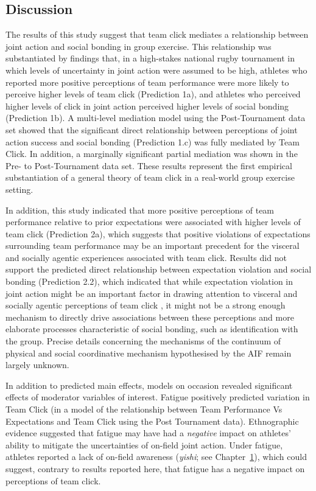 \begin{CJK}{UTF8}{gbsn}
\section{Discussion}
The results of this study suggest that team click mediates a relationship between joint action and social bonding in group exercise.  This relationship was substantiated by findings that, in a high-stakes national rugby tournament in which levels of uncertainty in joint action were assumed to be high, athletes who reported more positive perceptions of team performance were more likely to perceive higher levels of team click (Prediction 1a), and athletes who perceived higher levels of click in joint action perceived higher levels of social bonding (Prediction 1b).  A multi-level mediation model using the Post-Tournament data set showed that the significant direct relationship between perceptions of joint action success and social bonding (Prediction 1.c) was fully mediated by Team Click. In addition, a marginally significant partial mediation was shown in the Pre- to Post-Tournament data set.  These results represent the first empirical substantiation of a general theory of team click in a real-world group exercise setting.

In addition, this study indicated that more positive perceptions of team performance relative to prior expectations were associated with higher levels of team click (Prediction 2a), which suggests that positive violations of expectations surrounding team performance may be an important precedent for the visceral and socially agentic experiences associated with team click.  Results did not support the predicted direct relationship between expectation violation and social bonding (Prediction 2.2), which indicated that while expectation violation in joint action might be an important factor in drawing attention to visceral and socially agentic perceptions of team click \citep{Chietkrov2014,Clark2015}, it might not be a strong enough mechanism to directly drive associations between these perceptions and more elaborate processes characteristic of social bonding, such as identification with the group.  Precise details concerning the mechanisms of the continuum of physical and social coordinative mechanism hypothesised by the AIF remain largely unknown.

In addition to predicted main effects, models on occasion revealed significant effects of moderator variables of interest.  Fatigue positively predicted variation in Team Click (in a model of the relationship between Team Performance Vs Expectations and Team Click using the Post Tournament data).  Ethnographic evidence suggested that fatigue may have had a \textit{negative} impact on athletes' ability to mitigate the uncertainties of on-field joint action.  Under fatigue, athletes reported a lack of on-field awareness (\textit{yishi}; see Chapter~\ref{}), which could suggest, contrary to results reported here, that fatigue has a negative impact on perceptions of team click.


\end{CJK}
